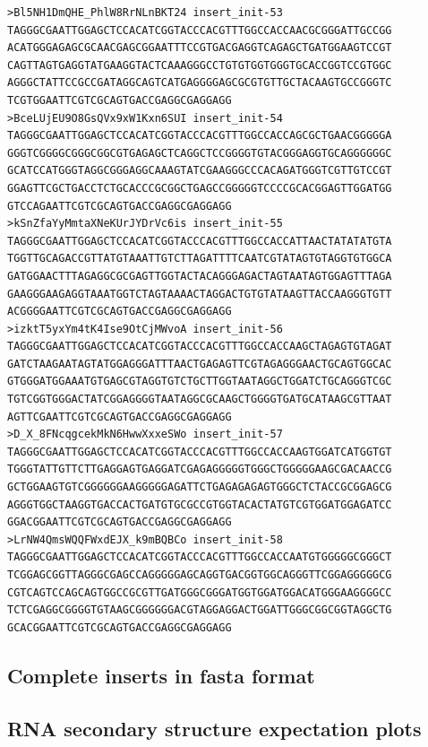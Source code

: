 \documentclass[11pt]{article}
\begin{document}
\begin{verbatim}
>Bl5NH1DmQHE_PhlW8RrNLnBKT24 insert_init-53
TAGGGCGAATTGGAGCTCCACATCGGTACCCACGTTTGGCCACCAACGCGGGATTGCCGG
ACATGGGAGAGCGCAACGAGCGGAATTTCCGTGACGAGGTCAGAGCTGATGGAAGTCCGT
CAGTTAGTGAGGTATGAAGGTACTCAAAGGGCCTGTGTGGTGGGTGCACCGGTCCGTGGC
AGGGCTATTCCGCCGATAGGCAGTCATGAGGGGAGCGCGTGTTGCTACAAGTGCCGGGTC
TCGTGGAATTCGTCGCAGTGACCGAGGCGAGGAGG
>BceLUjEU9O8GsQVx9xW1Kxn6SUI insert_init-54
TAGGGCGAATTGGAGCTCCACATCGGTACCCACGTTTGGCCACCAGCGCTGAACGGGGGA
GGGTCGGGGCGGGCGGCGTGAGAGCTCAGGCTCCGGGGTGTACGGGAGGTGCAGGGGGGC
GCATCCATGGGTAGGCGGGAGGCAAAGTATCGAAGGGCCCACAGATGGGTCGTTGTCCGT
GGAGTTCGCTGACCTCTGCACCCGCGGCTGAGCCGGGGGTCCCCGCACGGAGTTGGATGG
GTCCAGAATTCGTCGCAGTGACCGAGGCGAGGAGG
>kSnZfaYyMmtaXNeKUrJYDrVc6is insert_init-55
TAGGGCGAATTGGAGCTCCACATCGGTACCCACGTTTGGCCACCATTAACTATATATGTA
TGGTTGCAGACCGTTATGTAAATTGTCTTAGATTTTCAATCGTATAGTGTAGGTGTGGCA
GATGGAACTTTAGAGGCGCGAGTTGGTACTACAGGGAGACTAGTAATAGTGGAGTTTAGA
GAAGGGAAGAGGTAAATGGTCTAGTAAAACTAGGACTGTGTATAAGTTACCAAGGGTGTT
ACGGGGAATTCGTCGCAGTGACCGAGGCGAGGAGG
>izktT5yxYm4tK4Ise9OtCjMWvoA insert_init-56
TAGGGCGAATTGGAGCTCCACATCGGTACCCACGTTTGGCCACCAAGCTAGAGTGTAGAT
GATCTAAGAATAGTATGGAGGGATTTAACTGAGAGTTCGTAGAGGGAACTGCAGTGGCAC
GTGGGATGGAAATGTGAGCGTAGGTGTCTGCTTGGTAATAGGCTGGATCTGCAGGGTCGC
TGTCGGTGGGACTATCGGAGGGGTAATAGGCGCAAGCTGGGGTGATGCATAAGCGTTAAT
AGTTCGAATTCGTCGCAGTGACCGAGGCGAGGAGG
>D_X_8FNcqgcekMkN6HwwXxxeSWo insert_init-57
TAGGGCGAATTGGAGCTCCACATCGGTACCCACGTTTGGCCACCAAGTGGATCATGGTGT
TGGGTATTGTTCTTGAGGAGTGAGGATCGAGAGGGGGTGGGCTGGGGGAAGCGACAACCG
GCTGGAAGTGTCGGGGGGAAGGGGGAGATTCTGAGAGAGAGTGGGCTCTACCGCGGAGCG
AGGGTGGCTAAGGTGACCACTGATGTGCGCCGTGGTACACTATGTCGTGGATGGAGATCC
GGACGGAATTCGTCGCAGTGACCGAGGCGAGGAGG
>LrNW4QmsWQQFWxdEJX_k9mBQBCo insert_init-58
TAGGGCGAATTGGAGCTCCACATCGGTACCCACGTTTGGCCACCAATGTGGGGGCGGGCT
TCGGAGCGGTTAGGGCGAGCCAGGGGGAGCAGGTGACGGTGGCAGGGTTCGGAGGGGGCG
CGTCAGTCCAGCAGTGGCCGCGTTGATGGGCGGGATGGTGGATGGACATGGGAAGGGGCC
TCTCGAGGCGGGGTGTAAGCGGGGGGACGTAGGAGGACTGGATTGGGCGGCGGTAGGCTG
GCACGGAATTCGTCGCAGTGACCGAGGCGAGGAGG
\end{verbatim}

\subsection{Complete inserts in fasta format}


\subsection{RNA secondary structure expectation plots}




\pagebreak


\end{document}
